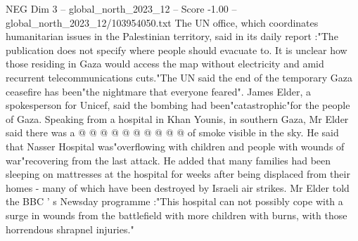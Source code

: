 \begin{textsample}{NEG Dim 3 – global\_north\_2023\_12 – Score -1.00 – global\_north\_2023\_12/103954050.txt}
The UN office, which coordinates humanitarian issues in the Palestinian territory, said in its daily report :"The publication does not specify where people should evacuate to.
It is unclear how those residing in Gaza would access the map without electricity and amid recurrent telecommunications cuts."The UN said the end of the temporary Gaza ceasefire has been"the nightmare that everyone feared".
James Elder, a spokesperson for Unicef, said the bombing had been"catastrophic"for the people of Gaza.
Speaking from a hospital in Khan Younis, in southern Gaza, Mr Elder said there was a @ @ @ @ @ @ @ @ @ @ of smoke visible in the sky.
He said that Nasser Hospital was"overflowing with children and people with wounds of war"recovering from the last attack.
He added that many families had been sleeping on mattresses at the hospital for weeks after being displaced from their homes - many of which have been destroyed by Israeli air strikes.
Mr Elder told the BBC ' s Newsday programme :"This hospital can not possibly cope with a surge in wounds from the battlefield with more children with burns, with those horrendous shrapnel injuries."

\end{textsample}
